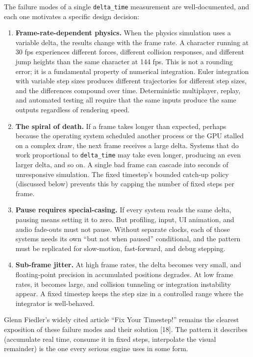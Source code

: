 \documentclass[
  11pt,
  letterpaper,
  DIV=11,
  numbers=noendperiod,
  twoside,
  open=right]{scrreprt}
\begin{document}
The failure modes of a single \texttt{delta\_time} measurement are
well-documented, and each one motivates a specific design decision:

\begin{enumerate}
\def\labelenumi{\arabic{enumi}.}
\item
  \textbf{Frame-rate-dependent physics.} When the physics simulation
  uses a variable delta, the results change with the frame rate. A
  character running at 30 fps experiences different forces, different
  collision responses, and different jump heights than the same
  character at 144 fps. This is not a rounding error; it is a
  fundamental property of numerical integration. Euler integration with
  variable step sizes produces different trajectories for different step
  sizes, and the differences compound over time. Deterministic
  multiplayer, replay, and automated testing all require that the same
  inputs produce the same outputs regardless of rendering speed.
\item
  \textbf{The spiral of death.} If a frame takes longer than expected,
  perhaps because the operating system scheduled another process or the
  GPU stalled on a complex draw, the next frame receives a large delta.
  Systems that do work proportional to \texttt{delta\_time} may take
  even longer, producing an even larger delta, and so on. A single bad
  frame can cascade into seconds of unresponsive simulation. The fixed
  timestep's bounded catch-up policy (discussed below) prevents this by
  capping the number of fixed steps per frame.
\item
  \textbf{Pause requires special-casing.} If every system reads the same
  delta, pausing means setting it to zero. But profiling, input, UI
  animation, and audio fade-outs must not pause. Without separate
  clocks, each of those systems needs its own ``but not when paused''
  conditional, and the pattern must be replicated for slow-motion,
  fast-forward, and debug stepping.
\item
  \textbf{Sub-frame jitter.} At high frame rates, the delta becomes very
  small, and floating-point precision in accumulated positions degrades.
  At low frame rates, it becomes large, and collision tunneling or
  integration instability appear. A fixed timestep keeps the step size
  in a controlled range where the integrator is well-behaved.
\end{enumerate}

Glenn Fiedler's widely cited article ``Fix Your Timestep!'' remains the
clearest exposition of these failure modes and their solution {[}18{]}.
The pattern it describes (accumulate real time, consume it in fixed
steps, interpolate the visual remainder) is the one every serious engine
uses in some form.
\end{document}
